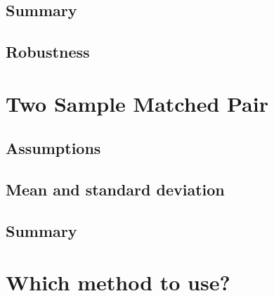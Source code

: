     \subsection{Summary}  %
    \subsection{Robustness}  %

\section{Two Sample Matched Pair}  %
    \subsection{Assumptions}  %
    \subsection{Mean and standard deviation}  %
    \subsection{Summary}  %

\section{Which method to use?}  %
